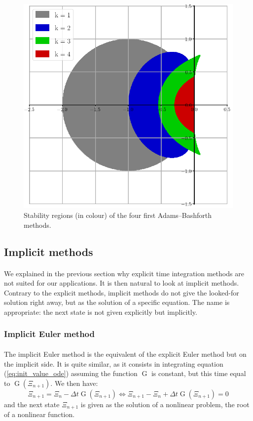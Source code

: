         \begin{figure}
          \centering
          \includegraphics[width=.6\textwidth]{figures/ab_stab.png}
          \caption{Stability regions (in colour) of the four first Adams--Bashforth methods.}
          \label{fig:ab_stab}
        \end{figure}


    \subsection{Implicit methods}

      \paragraph{}
      We explained in the previous section why explicit time integration methods are not suited for our applications.
      It is then natural to look at implicit methods.
      Contrary to the explicit methods, implicit methods do not give the looked-for solution right away, but as the solution of a specific equation.
      The name is appropriate: the next state is not given explicitly but implicitly.


      \subsubsection{Implicit Euler method}

        \paragraph{}
        The implicit Euler method is the equivalent of the explicit Euler method but on the implicit side.
        It is quite similar, as it consists in integrating equation (\ref{eq:init_value_ode}) assuming the function $\operatorname{G}$ is constant, but this time equal to $\operatorname{G}\left(\Xi_{n+1}\right)$.
        We then have:
        \begin{equation}
          \Xi_{n+1} = \Xi_n - \Delta t \operatorname{G}\left(\Xi_{n+1}\right)
          \Leftrightarrow \Xi_{n+1} - \Xi_n + \Delta t \operatorname{G}\left(\Xi_{n+1}\right) = 0
        \end{equation}
        and the next state $\Xi_{n+1}$ is given as the solution of a nonlinear problem, the root of a nonlinear function.

